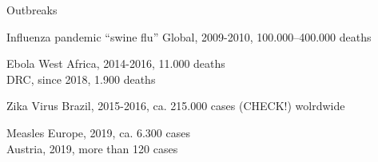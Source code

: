 \documentclass[table]{beamer}\usepackage[]{graphicx}\usepackage[]{color}
\begin{document}
{
%
%
\begin{frame}[fragile]{Outbreaks}

\begin{block} {Influenza pandemic ``swine flu''}
Global, 2009-2010, 100.000--400.000 deaths
\end{block}
\begin{block} {Ebola}
West Africa, 2014-2016, 11.000 deaths \\
DRC, since 2018, 1.900 deaths
\end{block}
\begin{block} {Zika Virus}
Brazil, 2015-2016, ca. 215.000 cases (CHECK!) wolrdwide
\end{block}
\begin{block} {Measles}
Europe, 2019, ca. 6.300 cases \\
Austria, 2019, more than 120 cases
\end{block}

\end{frame}
}
\end{document}
